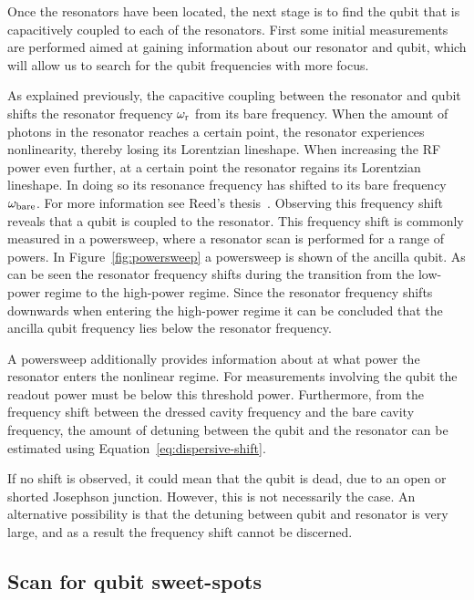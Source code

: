         Once the resonators have been located, the next stage is to find the qubit that is capacitively coupled to each of the resonators. First some initial measurements are performed aimed at gaining information about our resonator and qubit, which will allow us to search for the qubit frequencies with more focus.

        As explained previously, the capacitive coupling between the resonator and qubit shifts the resonator frequency $\omega_\text{r}$ from its bare frequency. When the amount of photons in the resonator reaches a certain point, the resonator experiences nonlinearity, thereby losing its Lorentzian lineshape. When increasing the RF power even further, at a certain point the resonator regains its Lorentzian lineshape. In doing so its resonance frequency has shifted to its bare frequency $\omega_\text{bare}$. For more information see Reed's thesis~\cite{Reed}. Observing this frequency shift reveals that a qubit is coupled to the resonator. This frequency shift is commonly measured in a powersweep, where a resonator scan is performed for a range of powers. In Figure~\ref{fig:powersweep} a powersweep is shown of the ancilla qubit. As can be seen the resonator frequency shifts during the transition from the low-power regime to the high-power regime. Since the resonator frequency shifts downwards when entering the high-power regime it can be concluded that the ancilla qubit frequency lies below the resonator frequency.

        A powersweep additionally provides information about at what power the resonator enters the nonlinear regime. For measurements involving the qubit the readout power must be below this threshold power. Furthermore, from the frequency shift between the dressed cavity frequency and the bare cavity frequency, the amount of detuning between the qubit and the resonator can be estimated using Equation~\ref{eq:dispersive-shift}.

        If no shift is observed, it could mean that the qubit is dead, due to an open or shorted Josephson junction. However, this is not necessarily the case. An alternative possibility is that the detuning between qubit and resonator is very large, and as a result the frequency shift cannot be discerned.

      \subsection{Scan for qubit sweet-spots}
        \label{Scan for qubit sweet-spots}

